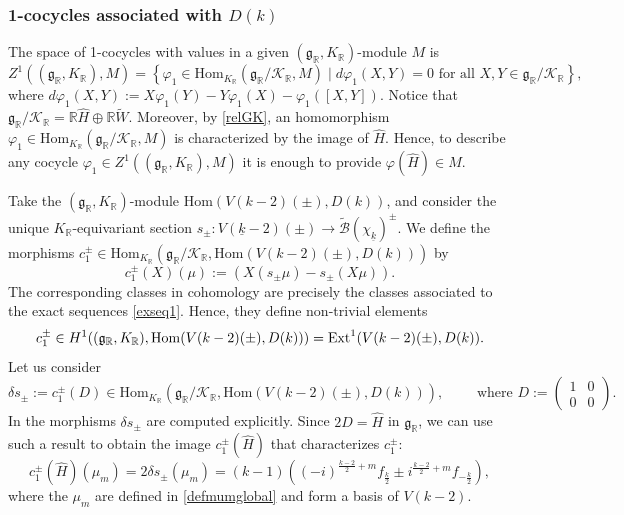 \documentclass{amsart}
\theoremstyle{definition}
\theoremstyle{remark}
\numberwithin{equation}{section}
\newcommand{\R}{{\mathbb R}}
\newcommand{\cB}{{\mathcal B}}
\newcommand{\cK}{{\mathcal K}}
\newcommand{\mfg}{{\mathfrak g}}
\newcommand{\Hom}{{\mathrm {Hom}}}
\begin{document}
\subsubsection{1-cocycles associated with $D(k)$} 
The space of 1-cocycles with values in a given $(\mfg_\R,K_\R)$-module $M$ is 
\[
Z^1((\mfg_\R,K_\R),M)=\left\{\varphi_1\in \Hom_{K_\R}\left(\mfg_\R/\cK_\R,M\right)\mid  d\varphi_1(X,Y)=0 \text{ for all } X,Y\in \mfg_\R/\cK_\R\right\},
\]
where $d\varphi_1(X,Y):=X\varphi_1(Y)-Y\varphi_1(X)-\varphi_1([X,Y])$. Notice that $\mfg_\R/\cK_\R=\R \hat H\oplus\R\tilde W$.
Moreover, by \eqref{relGK}, an homomorphism $\varphi_1\in \Hom_{K_\R}\left(\mfg_\R/\cK_\R,M\right)$ is characterized by the image of $\hat H$. Hence, to describe any cocycle $\varphi_1\in Z^1((\mfg_\R,K_\R),M)$ it is enough to provide $\varphi(\hat H)\in M$.


Take the $(\mfg_\R,K_\R)$-module $\Hom(V(k-2)(\pm),D({k}))$, and consider the unique $K_\R$-equivariant section $s_\pm:V(\underline k-2)(\pm)\rightarrow\tilde \cB(\chi_{\underline k})^\pm$. We define the morphisms $c_1^\pm \in \Hom_{K_\R}\left(\mfg_\R/\cK_\R,\Hom(V(k-2)(\pm),D({k}))\right)$ by 
\[
c^\pm_1(X)(\mu):=\left(X(s_\pm\mu)-s_\pm(X\mu)\right).
\]
The corresponding classes in cohomology are precisely the classes associated to the exact sequences \eqref{exseq1}. Hence, they define non-trivial elements
\begin{equation}\label{firstdefc1}
    c_1^\pm\in H^1((\mfg_\R,K_\R),\Hom(V(k-2)(\pm),D({k})))={\rm Ext}^1(V(k-2)(\pm),D(k)).
\end{equation}
Let us consider 
\begin{equation}\label{firstdefds}
\delta s_\pm:=c_1^\pm(D)\in\Hom_{K_\R}\left(\mfg_\R/\cK_\R,\Hom(V(k-2)(\pm),D({k}))\right),\qquad   \text{ where } D:=\left(\begin{array}{cc}
    1&0\\0&0
\end{array}\right).
\end{equation}
In \cite[Proposition 4.7]{preprintsanti2} the morphisms $\delta s_\pm$ are computed explicitly. Since $2D= \hat H$ in $\mfg_\R$,
we can use such a result to obtain the image $c_1^\pm(\hat H)$ that characterizes $c_1^\pm$:
\begin{equation}\label{descc1+}
c_1^\pm(\hat H)(\mu_m)=2\delta s_\pm(\mu_m)=(k-1)\left((-i)^{\frac{k-2}{2}+m}f_{\frac{k}{2}}\pm i^{\frac{k-2}{2}+m}f_{-\frac{k}{2}}\right),
\end{equation}
where the $\mu_m$ are defined in \eqref{defmumglobal} and form a basis of $V(k-2)$.
\end{document}
